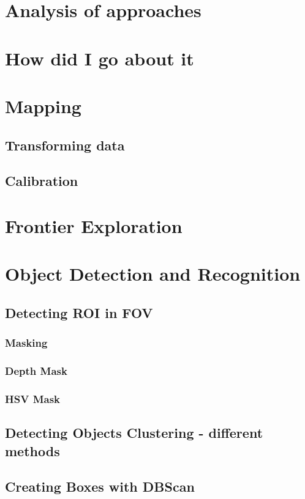 \documentclass{mproj}
\begin{document}
\section{Analysis of approaches}
\section{How did I go about it}

\section{Mapping}
\subsection{Transforming data}
\subsection{Calibration}

\section{Frontier Exploration}

\section{Object Detection and Recognition}
\subsection{Detecting ROI in FOV}
\subsubsection{Masking}
\subsubsection{Depth Mask}
\subsubsection{HSV Mask}
\subsection{Detecting Objects Clustering - different methods}
\subsection{Creating Boxes with DBScan}
\end{document}
